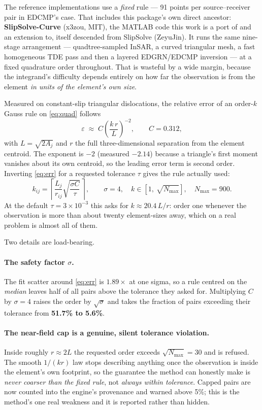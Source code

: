 \documentclass[11pt,a4paper]{article}
\begin{document}
The reference implementations use a \emph{fixed} rule --- 91 points per
source--receiver pair in EDCMP's case. That includes this package's own direct
ancestor: \textbf{SlipSolve-Curve} (x3zou, MIT), the MATLAB code this work is a
port of and an extension to, itself descended from SlipSolve (ZeyuJin). It runs
the same nine-stage arrangement --- quadtree-sampled InSAR, a curved triangular
mesh, a fast homogeneous TDE pass and then a layered EDGRN/EDCMP inversion ---
at a fixed quadrature order throughout. That is wasteful by a wide
margin, because the integrand's difficulty depends entirely on how far the
observation is from the element \emph{in units of the element's own size}.

Measured on constant-slip triangular dislocations, the relative error of an
order-$k$ Gauss rule on \eqref{eq:quad} follows
\begin{equation}
\varepsilon \;\approx\; C \left(\frac{k\,r}{L}\right)^{-2},
\qquad C = 0.312 ,
\label{eq:err}
\end{equation}
with $L = \sqrt{2A_j}$ and $r$ the full three-dimensional separation from the
element centroid. The exponent is $-2$ (measured $-2.14$) because a triangle's
first moment vanishes about its own centroid, so the leading error term is second
order. Inverting \eqref{eq:err} for a requested tolerance $\tau$ gives the rule
actually used:
\begin{equation}
\boxed{\;
k_{ij} = \left\lceil \frac{L_j}{r_{ij}}\sqrt{\frac{\sigma C}{\tau}} \,\right\rceil,
\qquad \sigma = 4, \quad
k \in \left[1,\ \sqrt{N_{\max}}\right],\quad N_{\max}=900.
\;}
\label{eq:order}
\end{equation}
At the default $\tau = 3\times 10^{-3}$ this asks for $k \approx 20.4\,L/r$: order
one whenever the observation is more than about twenty element-sizes away, which
on a real problem is almost all of them.

Two details are load-bearing.

\paragraph{The safety factor $\sigma$.} The fit scatter around \eqref{eq:err} is
$1.89\times$ at one sigma, so a rule centred on the \emph{median} leaves half of
all pairs above the tolerance they asked for. Multiplying $C$ by $\sigma = 4$
raises the order by $\sqrt{\sigma}$ and takes the fraction of pairs exceeding
their tolerance from \textbf{51.7\% to 5.6\%}.

\paragraph{The near-field cap is a genuine, silent tolerance violation.} Inside
roughly $r \approx 2L$ the requested order exceeds $\sqrt{N_{\max}} = 30$ and is
refused. The smooth $1/(kr)$ law stops describing anything once the observation
is inside the element's own footprint, so the guarantee the method can honestly
make is \emph{never coarser than the fixed rule}, not \emph{always within
tolerance}. Capped pairs are now counted into the engine's provenance and warned
above 5\%; this is the method's one real weakness and it is reported rather than
hidden.
\end{document}
